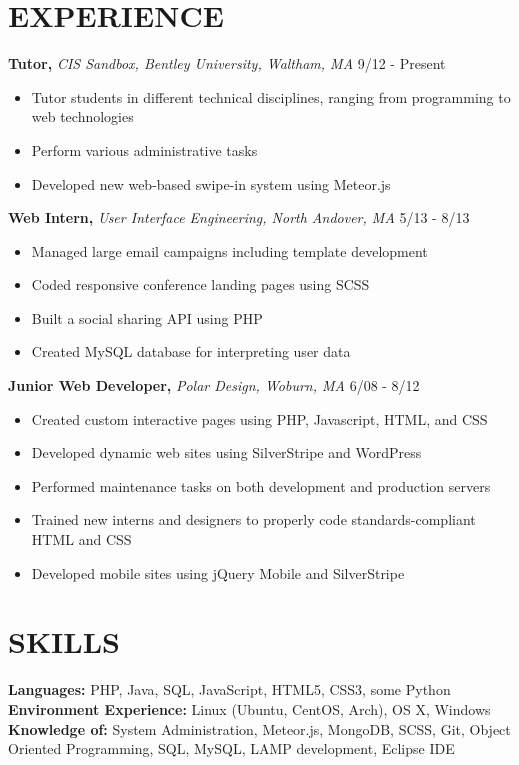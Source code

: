\documentclass[line, margin]{res}
\begin{document}
\begin{resume}
 
\section{EXPERIENCE}
\textbf{Tutor,} \textit{CIS Sandbox, Bentley University, Waltham, MA} \hfill 9/12 - Present
\begin{itemize}
    \item Tutor students in different technical disciplines, ranging from programming to web technologies
    \item Perform various administrative tasks
    \item Developed new web-based swipe-in system using Meteor.js
\end{itemize}
\textbf{Web Intern,} \textit{User Interface Engineering, North Andover, MA} \hfill 5/13 - 8/13
\begin{itemize}
    \item Managed large email campaigns including template development
    \item Coded responsive conference landing pages using SCSS
    \item Built a social sharing API using PHP
    \item Created MySQL database for interpreting user data
\end{itemize}
\textbf{Junior Web Developer,} \textit{Polar Design, Woburn, MA} \hfill 6/08 - 8/12
\begin{itemize}
    \item Created custom interactive pages using PHP, Javascript, HTML, and CSS
    \item Developed dynamic web sites using SilverStripe and WordPress
    \item Performed maintenance tasks on both development and production servers
    \item Trained new interns and designers to properly code standards-compliant HTML and CSS
    \item Developed mobile sites using jQuery Mobile and SilverStripe
\end{itemize}

\section{SKILLS}
\textbf{Languages: }PHP, Java, SQL, JavaScript, HTML5, CSS3, some Python\\
\textbf{Environment Experience: } Linux (Ubuntu, CentOS, Arch), OS X, Windows\\
\textbf{Knowledge of: } System Administration, Meteor.js, MongoDB, SCSS,
Git, Object Oriented Programming, SQL, MySQL, LAMP development, Eclipse IDE

\end{resume}
\end{document}
